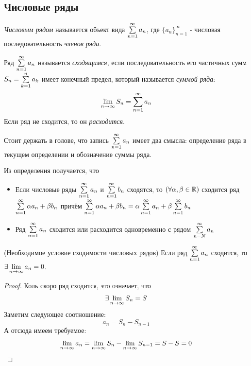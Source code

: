 \subsection{Числовые ряды}

\begin{definition}
	\textit{Числовым рядом} называется объект вида $\sum\limits_{n = 1}^\infty a_n$, где $\{a_n\}_{n=1}^\infty$ - числовая последовательность \textit{членов ряда}. 
\end{definition}

\begin{definition}
	Ряд $\sum\limits_{n = 1}^\infty a_n$ называется \textit{сходящимся}, если последовательность его частичных сумм $S_n = \sum\limits_{k = 1}^n a_k$ имеет конечный предел, который называется \textit{суммой ряда}:
	\[
		\lim\limits_{n \to \infty} S_n = \sum\limits_{n = 1}^\infty a_n
	\]
	Если ряд не сходится, то он \textit{расходится}.
\end{definition}

\begin{note}
	Стоит держать в голове, что запись $\sum\limits_{n = 1}^\infty a_n$ имеет два смысла: определение ряда в текущем определении и обозначение суммы ряда.
\end{note}

\begin{corollary}
	Из определения получается, что 
	\begin{itemize}
		\item Если числовые  ряды $\sum\limits_{n = 1}^\infty a_n$ и $\sum\limits_{n = 1}^\infty b_n$ сходятся, то $(\forall \alpha, \beta \in \mathbb{R})$ сходится ряд $\sum\limits_{n = 1}^\infty \alpha a_n + \beta b_n$ причём $\sum\limits_{n = 1}^\infty \alpha a_n + \beta b_n = \alpha \sum\limits_{n = 1}^\infty a_n + \beta \sum\limits_{n = 1}^\infty b_n$
		\item Ряд $\sum\limits_{n = 1}^\infty a_n$ сходится или расходится одновременно с рядом $\sum\limits_{n = N}^\infty a_n$  
	\end{itemize}
\end{corollary}

\begin{theorem} (Необходимое условие сходимости числовых рядов)
	Если ряд $\sum\limits_{n = 1}^\infty a_n$ сходится, то $\exists \lim\limits_{n \to \infty} a_n = 0$.
\end{theorem}

\begin{proof}
	Коль скоро ряд сходится, это означает, что
	\[
		\exists \lim\limits_{n \to \infty} S_n = S
	\]
	Заметим следующее соотношение:
	\[
		a_n = S_n - S_{n - 1}
	\]
	А отсюда имеем требуемое:
	\[
		\lim\limits_{n \to \infty} a_n = \lim\limits_{n \to \infty} S_n - \lim\limits_{n \to \infty} S_{n - 1} = S - S = 0
	\]
\end{proof}

